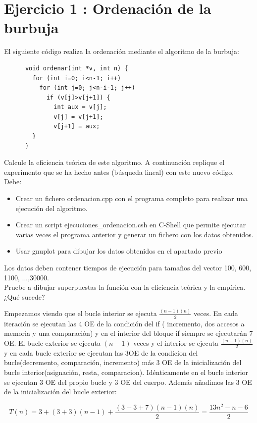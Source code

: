 \documentclass{article}
\begin{document}
\section{Ejercicio 1 : Ordenación de la burbuja}
El siguiente código realiza la ordenación mediante el algoritmo de la burbuja:
\begin{lstlisting}
      void ordenar(int *v, int n) {
        for (int i=0; i<n-1; i++)
          for (int j=0; j<n-i-1; j++)
            if (v[j]>v[j+1]) {
              int aux = v[j];
              v[j] = v[j+1];
              v[j+1] = aux;
		} 
      }
\end{lstlisting}

Calcule la eficiencia teórica de este algoritmo. A continuación replique el experimento que se ha hecho antes (búsqueda lineal) con este nuevo código. Debe:
\begin{itemize}
	\item Crear un fichero ordenacion.cpp con el programa completo para realizar una ejecución del algoritmo.
	\item Crear un script ejecuciones\_ordenacion.csh en C-Shell que permite ejecutar varias veces el programa anterior y generar un fichero con los datos obtenidos.
	\item Usar gnuplot para dibujar los datos obtenidos en el apartado previo
\end{itemize}
Los datos deben contener tiempos de ejecución para tamaños del vector 100, 600, 1100, ...,30000. \\
Pruebe a dibujar superpuestas la función con la eficiencia teórica y la empírica. ¿Qué sucede? 
\clearpage


Empezamos viendo que el bucle interior se ejecuta $\frac{(n-1)(n)}{2}$ veces.
En cada iteración se ejecutan las 4 OE de la condición del if ( incremento, dos accesos a memoria y una comparación) y  en el interior del bloque if siempre se ejecutarán 7 OE. El bucle exterior se ejecuta $(n-1)$ veces y el interior se ejecuta $\frac{(n-1)(n)}{2}$ y en cada bucle exterior se ejecutan las 3OE de la condicion del bucle(decremento, comparación, incremento) más 3 OE de la inicialización del bucle interior(asignación, resta, comparacion). Idénticamente en el bucle interior se ejecutan 3 OE del propio bucle y 3 OE del cuerpo. Además añadimos las 3 OE de la inicialización del bucle exterior:

		\begin{equation}
			T(n) = 3 + (3+3)(n-1) + \frac{(3+3+7)(n-1)(n)}{2} = \frac{13n^2 -n -6}{2}
		\end{equation}
\end{document}
